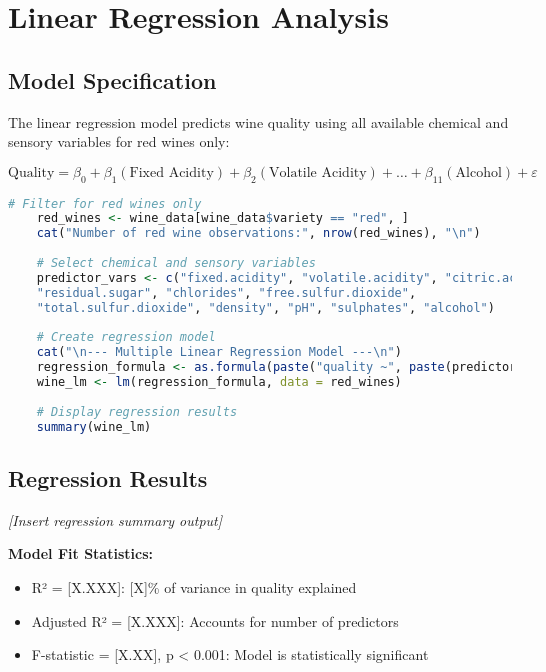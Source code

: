 \section{Linear Regression Analysis}

\subsection{Model Specification}

The linear regression model predicts wine quality using all available chemical and sensory variables for red wines only:

\begin{equation}
	\text{Quality} = \beta_0 + \beta_1(\text{Fixed Acidity}) + \beta_2(\text{Volatile Acidity}) + \ldots + \beta_{11}(\text{Alcohol}) + \varepsilon
\end{equation}

\begin{lstlisting}[language=R, caption=Linear Regression Model Setup]
	# Filter for red wines only
	red_wines <- wine_data[wine_data$variety == "red", ]
	cat("Number of red wine observations:", nrow(red_wines), "\n")
	
	# Select chemical and sensory variables
	predictor_vars <- c("fixed.acidity", "volatile.acidity", "citric.acid", 
	"residual.sugar", "chlorides", "free.sulfur.dioxide", 
	"total.sulfur.dioxide", "density", "pH", "sulphates", "alcohol")
	
	# Create regression model
	cat("\n--- Multiple Linear Regression Model ---\n")
	regression_formula <- as.formula(paste("quality ~", paste(predictor_vars, collapse = " + ")))
	wine_lm <- lm(regression_formula, data = red_wines)
	
	# Display regression results
	summary(wine_lm)
\end{lstlisting}

\subsection{Regression Results}

\textit{[Insert regression summary output]}

\textbf{Model Fit Statistics:}
\begin{itemize}
	\item R² = [X.XXX]: [X]\% of variance in quality explained
	\item Adjusted R² = [X.XXX]: Accounts for number of predictors
	\item F-statistic = [X.XX], p < 0.001: Model is statistically significant
\end{itemize}

